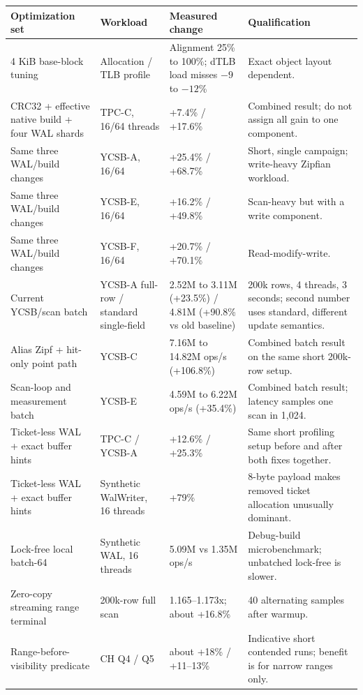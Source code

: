 \documentclass[10pt,a4paper,landscape]{article}
\begin{document}
\begin{longtable}{p{6.1cm}p{5.2cm}p{5.5cm}p{6.6cm}}
\toprule
\textbf{Optimization set} & \textbf{Workload} & \textbf{Measured change} &
\textbf{Qualification} \\
\midrule
\endhead
4 KiB base-block tuning & Allocation / TLB profile & Alignment 25\% to 100\%; dTLB load
misses $-9$ to $-12$\% & Exact object layout dependent. \\
CRC32 + effective native build + four WAL shards & TPC-C, 16/64 threads & +7.4\% / +17.6\%
& Combined result; do not assign all gain to one component. \\
Same three WAL/build changes & YCSB-A, 16/64 & +25.4\% / +68.7\% & Short, single campaign;
write-heavy Zipfian workload. \\
Same three WAL/build changes & YCSB-E, 16/64 & +16.2\% / +49.8\% & Scan-heavy but with a
write component. \\
Same three WAL/build changes & YCSB-F, 16/64 & +20.7\% / +70.1\% & Read-modify-write. \\
Current YCSB/scan batch & YCSB-A full-row / standard single-field & 2.52M to 3.11M
(+23.5\%) / 4.81M (+90.8\% vs old baseline) & 200k rows, 4 threads, 3 seconds; second
number uses standard, different update semantics. \\
Alias Zipf + hit-only point path & YCSB-C & 7.16M to 14.82M ops/s (+106.8\%) & Combined
batch result on the same short 200k-row setup. \\
Scan-loop and measurement batch & YCSB-E & 4.59M to 6.22M ops/s (+35.4\%) & Combined
batch result; latency samples one scan in 1,024. \\
Ticket-less WAL + exact buffer hints & TPC-C / YCSB-A & +12.6\% / +25.3\% & Same short
profiling setup before and after both fixes together. \\
Ticket-less WAL + exact buffer hints & Synthetic WalWriter, 16 threads & +79\% & 8-byte
payload makes removed ticket allocation unusually dominant. \\
Lock-free local batch-64 & Synthetic WAL, 16 threads & 5.09M vs 1.35M ops/s & Debug-build
microbenchmark; unbatched lock-free is slower. \\
Zero-copy streaming range terminal & 200k-row full scan & 1.165--1.173x; about +16.8\% &
40 alternating samples after warmup. \\
Range-before-visibility predicate & CH Q4 / Q5 & about +18\% / +11--13\% & Indicative
short contended runs; benefit is for narrow ranges only. \\

\end{longtable}
\end{document}
